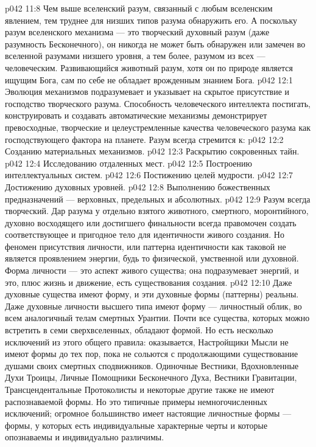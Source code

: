 \vs p042 11:8 Чем выше вселенский разум, связанный с любым вселенским явлением, тем труднее для низших типов разума обнаружить его. А поскольку разум вселенского механизма --- это творческий духовный разум (даже разумность Бесконечного), он никогда не может быть обнаружен или замечен во вселенной разумами низшего уровня, а тем более,  разумом из всех --- человеческим. Развивающийся животный разум, хотя он по природе является ищущим Бога, сам по себе не обладает врожденным знанием Бога.
\vs p042 12:1 Эволюция механизмов подразумевает и указывает на скрытое присутствие и господство творческого разума. Способность человеческого интеллекта постигать, конструировать и создавать автоматические механизмы демонстрирует превосходные, творческие и целеустремленные качества человеческого разума как господствующего фактора на планете. Разум всегда стремится к:
\vs p042 12:2 \bibnobreakspace Созданию материальных механизмов.
\vs p042 12:3 \bibnobreakspace Раскрытию сокровенных тайн.
\vs p042 12:4 \bibnobreakspace Исследованию отдаленных мест.
\vs p042 12:5 \bibnobreakspace Построению интеллектуальных систем.
\vs p042 12:6 \bibnobreakspace Постижению целей мудрости.
\vs p042 12:7 \bibnobreakspace Достижению духовных уровней.
\vs p042 12:8 \bibnobreakspace Выполнению божественных предназначений --- верховных, предельных и абсолютных.
\vs p042 12:9 \pc Разум всегда творческий. Дар разума у отдельно взятого животного, смертного, моронтийного, духовно восходящего или достигшего финальности всегда правомочен создать соответствующее и пригодное тело для идентичности живого создания. Но феномен присутствия личности, или паттерна идентичности как таковой не является проявлением энергии, будь то физической, умственной или духовной. Форма личности --- это  аспект живого существа; она подразумевает  энергий, и это, плюс жизнь и движение, есть  существования создания.
\vs p042 12:10 Даже духовные существа имеют форму, и эти духовные формы (паттерны) реальны. Даже духовные личности высшего типа имеют форму --- личностный облик, во всем аналогичный телам смертных Урантии. Почти все существа, которых можно встретить в семи сверхвселенных, обладают формой. Но есть несколько исключений из этого общего правила: оказывается, Настройщики Мысли не имеют формы до тех пор, пока не сольются с продолжающими существование душами своих смертных сподвижников. Одиночные Вестники, Вдохновленные Духи Троицы, Личные Помощники Бесконечного Духа, Вестники Гравитации, Трансцендентальные Протоколисты и некоторые другие также не имеют распознаваемой формы. Но это типичные примеры немногочисленных исключений; огромное большинство имеет настоящие личностные формы --- формы, у которых есть индивидуальные характерные черты и которые опознаваемы и индивидуально различимы.
